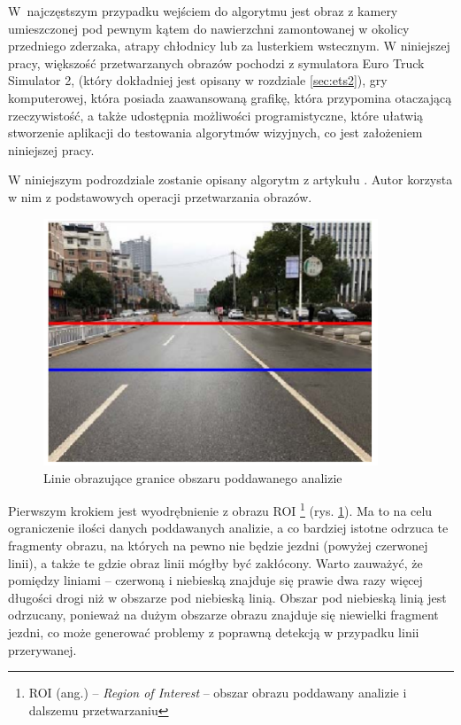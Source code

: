 W~najczęstszym przypadku wejściem do algorytmu jest obraz z kamery umieszczonej pod pewnym kątem do nawierzchni zamontowanej w okolicy przedniego zderzaka, atrapy chłodnicy lub za lusterkiem wstecznym.
W niniejszej pracy, większość przetwarzanych obrazów pochodzi z symulatora Euro Truck Simulator 2, (który dokładniej jest opisany w rozdziale \ref{sec:ets2}), gry komputerowej, która posiada zaawansowaną grafikę, która przypomina otaczającą rzeczywistość, a także udostępnia możliwości programistyczne, które ułatwią stworzenie aplikacji do testowania algorytmów wizyjnych, co jest założeniem niniejszej pracy.

W niniejszym podrozdziale zostanie opisany algorytm z artykułu \cite{T3}. 
Autor korzysta w nim z podstawowych operacji przetwarzania obrazów. 

\begin{figure}
  \centering
  \includegraphics[width=10cm]{img/roi.png}
  \caption{Linie obrazujące granice obszaru poddawanego analizie\cite{T3}}
  \label{fig:roi} 
\end{figure}


Pierwszym krokiem jest wyodrębnienie z obrazu ROI \footnote{ROI (ang.) -- \textit{Region of Interest} -- obszar obrazu poddawany analizie i dalszemu przetwarzaniu} (rys. \ref{fig:roi}). 
Ma to na celu ograniczenie ilości danych poddawanych analizie, a co bardziej istotne odrzuca te fragmenty obrazu, na których na pewno nie będzie jezdni (powyżej czerwonej linii), a także te gdzie obraz linii mógłby być zakłócony. 
Warto zauważyć, że pomiędzy liniami -- czerwoną i niebieską znajduje się prawie dwa razy więcej długości drogi niż w obszarze pod niebieską linią. Obszar pod niebieską linią jest odrzucany, ponieważ na dużym obszarze obrazu znajduje się niewielki fragment jezdni, co może generować problemy z poprawną detekcją w przypadku linii przerywanej.

